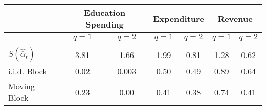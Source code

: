 \begin{tabular}{@{}lcccccc@{}}
	\toprule 
	& \multicolumn{2}{c}{ Education Spending } & \multicolumn{2}{c}{ Expenditure } & \multicolumn{2}{c}{ Revenue } \\
	\hline
	& $q=1$ & $q=2$ & $q=1$ & $q=2$ & $q=1$ & $q=2$ \\
	\hline \\
	$S (\hat{\bar{\alpha}}_{t})$ & 3.81 & 1.66 & 1.99 & 0.81 & 1.28 & 0.62\vspace{2mm}\\
	i.i.d. Block & 0.02 & 0.003 & 0.50 & 0.49 & 0.89 & 0.64\\
	Moving Block & 0.23 & 0.00 & 0.41 & 0.38 & 0.74 & 0.41 \\
	\bottomrule
\end{tabular}
